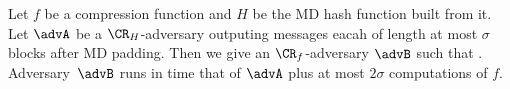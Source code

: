 
\begin{theorem*}
Let $f$ be a compression function and $H$ be the MD hash function built from it. 
Let $\advA$ be a $\CR_H$-adversary outputing messages eacah of length at most $\sigma$
blocks after MD padding. Then we give an $\CR_f$-adversary $\advB$
such that
\bnm
   \le {} \;.
\enm
Adversary~$\advB$ runs in time that of $\advA$ plus at most $2\sigma$ computations of
$f$.
\end{theorem*}




